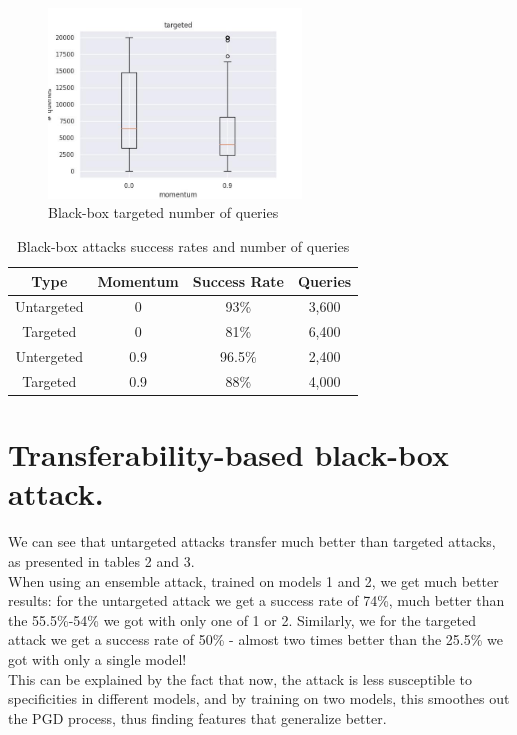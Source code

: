 \documentclass[12pt, a4paper]{article}
\begin{document}
\begin{figure}[hbt]
  \centering
  \includegraphics[width=0.6\textwidth]{bbox-n_queries_targeted}  
  \caption{Black-box targeted number of queries}
  \label{fig:bbox-targeted}
\end{figure}

\begin{table}[hbt]
  \begin{center}
    \begin{tabular}{|c|c|c|c|}
      \hline
    Type & Momentum & Success Rate & Queries \\
      \hline
    Untargeted & 0 & 93\% & 3,600\\
      \hline
    Targeted & 0 & 81\% & 6,400\\
      \hline
    Untergeted & 0.9 & 96.5\% & 2,400\\
      \hline
    Targeted & 0.9 & 88\% & 4,000\\
      \hline
    \end{tabular}
    \caption{Black-box attacks success rates and number of queries}
  \end{center}
  \label{tab:bbox}
\end{table}


\section{Transferability-based black-box attack.}

We can see that untargeted attacks transfer much better than targeted attacks, as presented in tables 2 and 3. \\
When using an ensemble attack, trained on models 1 and 2, we get much better results: for the untargeted attack we get a success rate of 74\%, much better than the 55.5\%-54\% we got with only one of 1 or 2. Similarly, we for the targeted attack we get a success rate of 50\% - almost two times better than the 25.5\% we got with only a single model! \\
This can be explained by the fact that now, the attack is less susceptible to specificities in different models, and by training on two models, this smoothes out the PGD process, thus finding features that generalize better. 
\end{document}
